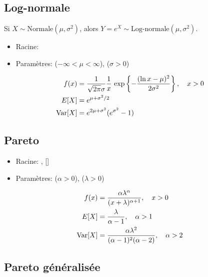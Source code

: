 \subsection{Log-normale}
\label{distributions:log-normale}

Si $X \sim \text{Normale}(\mu, \sigma^2)$, alors $Y = e^X \sim
\text{Log-normale}(\mu, \sigma^2)$.
\begin{itemize}
\item Racine: 
\item Paramètres:  ($-\infty < \mu < \infty$), 
  ($\sigma > 0$)
\end{itemize}
\begin{align*}
  f(x)
  &= \frac{1}{\sqrt{2\pi} \sigma} \frac{1}{x}\,
  \exp\left\{ -\frac{(\ln x - \mu)^2}{2\sigma^2} \right\}, \quad
  x > 0 \\
  E [ X ]
  &= e^{\mu + \sigma^2/2} \\
  \operatorname{Var} [ X ]
  &= e^{2\mu + \sigma^2}(e^{\sigma^2} - 1) \\
\end{align*}

\subsection{Pareto}
\label{distributions:pareto}

\begin{itemize}
\item Racine: ,  []
\item Paramètres:  ($\alpha > 0$),
        ($\lambda > 0$)
\end{itemize}
\begin{align*}
  f(x) &=
  \frac{\alpha \lambda^\alpha}{(x + \lambda)^{\alpha+1}},
  \quad x > 0 \\
  E [ X ]
  &= \frac{\lambda}{\alpha - 1}, \quad \alpha > 1 \\
  \operatorname{Var} [ X ]
  &= \frac{\alpha \lambda^2}{(\alpha - 1)^2 (\alpha - 2)}, \quad
  \alpha > 2
\end{align*}

\subsection{Pareto généralisée}
\label{distributions:paretogen}

